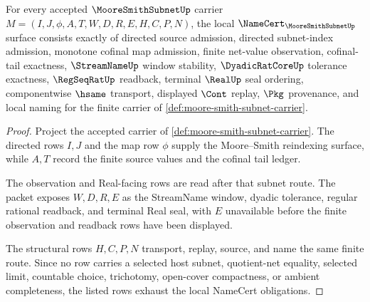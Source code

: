 \begin{theorem}
\label{thm:moore-smith-subnet-namecert-obligations}
For every accepted $\MooreSmithSubnetUp$ carrier $M=(I,J,\phi,A,T,W,D,R,E,H,C,P,N)$, the local $\NameCert_{\MooreSmithSubnetUp}$ surface consists exactly of directed source admission, directed subnet-index admission, monotone cofinal map admission, finite net-value observation, cofinal-tail exactness, $\StreamNameUp$ window stability, $\DyadicRatCoreUp$ tolerance exactness, $\RegSeqRatUp$ readback, terminal $\RealUp$ seal ordering, componentwise $\hsame$ transport, displayed $\Cont$ replay, $\Pkg$ provenance, and local naming for the finite carrier of \autoref{def:moore-smith-subnet-carrier}.
\end{theorem}
\begin{proof}
Project the accepted carrier of \autoref{def:moore-smith-subnet-carrier}. The directed rows $I,J$ and the map row $\phi$ supply the Moore--Smith reindexing surface, while $A,T$ record the finite source values and the cofinal tail ledger.

The observation and Real-facing rows are read after that subnet route. The packet exposes $W,D,R,E$ as the StreamName window, dyadic tolerance, regular rational readback, and terminal Real seal, with $E$ unavailable before the finite observation and readback rows have been displayed.

The structural rows $H,C,P,N$ transport, replay, source, and name the same finite route. Since no row carries a selected host subnet, quotient-net equality, selected limit, countable choice, trichotomy, open-cover compactness, or ambient completeness, the listed rows exhaust the local NameCert obligations.
\end{proof}

